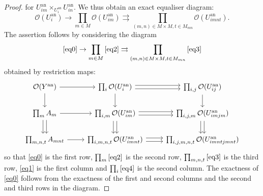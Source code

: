 \documentclass[10pt,a4paper]{amsart}
\newcommand{\OO}{\mathcal O}
\newcommand{\ana}{\mathrm{an}}
\begin{document}
\begin{proof}
for $U_{im}^{\ana}\times_{U_i^{\ana}}U^{\ana}_{in}$. We thus obtain an exact equaliser diagram: 
\begin{equation}\label{eq4} 
\OO(U_i^{\ana})\rightarrow \prod_{m\in M} \OO(U_{im}^{\ana})\rightrightarrows
\prod_{(m,n)\in M\times M, t\in M_{mn}}\OO(U_{imnt}^{\ana}).
\end{equation}
The assertion follows by considering 
the diagram 
\begin{equation} 
\eqref{eq0}\rightarrow \prod_{m\in M} \eqref{eq2}\rightrightarrows \prod_{(m,n)\in M\times M, t\in M_{mn}} \eqref{eq3}
\end{equation}
obtained by restriction maps:
\begin{equation}
\begin{tikzcd}
\OO(Y^{\ana})\arrow[r]\arrow[d] & \prod_{i} \OO(U_i^{\ana})\arrow[r, shift left]
        \arrow[r, shift right]\ar[d] & 
\prod_{i,j} \OO(U_{ij}^{\ana})\arrow[d] \\
\prod_m A_{m}\arrow[r]
\arrow[d, shift left]
        \arrow[d, shift right]& \prod_{i, m} \OO(U_{im}^{\ana})\arrow[r, shift left]
        \arrow[r, shift right]\arrow[d, shift left]
        \arrow[d, shift right]& \prod_{i,j,m} \OO(U_{imjm}^{\ana}) \arrow[d, shift left]
        \arrow[d, shift right]\\
        \prod_{m,n,t}A_{mnt}\arrow[r] &\prod_{i,m,n,t} \OO(U_{imnt}^{\ana})\arrow[r, shift left]
        \arrow[r, shift right]& \prod_{i,j,m,n,t} \OO(U_{imntjmnt}^{\ana})
  \end{tikzcd}
\end{equation}
so that \eqref{eq0} is the first row, $\prod_m \eqref{eq2}$ is the second row, $\prod_{m,n,t} \eqref{eq3}$ is the third row, \eqref{eq1} is the first column and $\prod_{i}\eqref{eq4}$ is the second column. The exactness of \eqref{eq0} follows from the exactness of the first and second columns and the second and third rows in the diagram. 
\end{proof}
\end{document}
